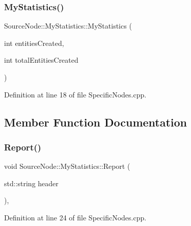 \mbox{\label{class_source_node_1_1_my_statistics_ae44331e668fad1f8caf1779905a3bbf2}} 
\subsubsection{\texorpdfstring{My\+Statistics()}{MyStatistics()}\hspace{0.1cm}{\footnotesize\ttfamily [2/2]}}
{\footnotesize\ttfamily Source\+Node\+::\+My\+Statistics\+::\+My\+Statistics (\begin{DoxyParamCaption}\item[{int}]{entities\+Created,  }\item[{int}]{total\+Entities\+Created }\end{DoxyParamCaption})\hspace{0.3cm}{\ttfamily [inline]}}



Definition at line 18 of file Specific\+Nodes.\+cpp.



\subsection{Member Function Documentation}
\mbox{\label{class_source_node_1_1_my_statistics_a39931b0ce449658de7d6be309dca8eee}} 
\subsubsection{\texorpdfstring{Report()}{Report()}}
{\footnotesize\ttfamily void Source\+Node\+::\+My\+Statistics\+::\+Report (\begin{DoxyParamCaption}\item[{std\+::string}]{header }\end{DoxyParamCaption})\hspace{0.3cm}{\ttfamily [inline]}, {\ttfamily [override]}}



Definition at line 24 of file Specific\+Nodes.\+cpp.

